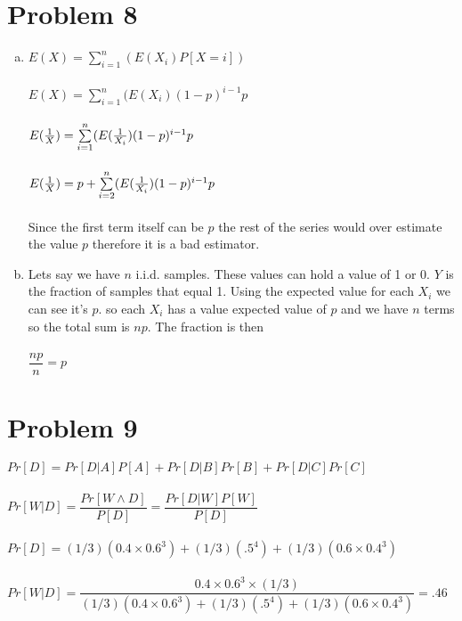 \documentclass[11pt,letterpaper]{article}
\begin{document}
\section*{Problem 8}
\begin{enumerate}[(a)]
\item
$E(X) = \sum\limits_{i=1}^{n}(E(X_i)P[X=i])$\\\\
$E(X) = \sum\limits_{i=1}^{n}(E(X_i)(1-p)^{i-1}p$\\\\
$E({1\over X}) = \sum\limits_{i=1}^{n}(E({1\over X_i})(1-p)^{i-1}p$\\\\
$E({1\over X}) = p + \sum\limits_{i=2}^{n}(E({1\over X_i})(1-p)^{i-1}p$\\\\
Since the first term itself can be $p$ the rest of the series would over estimate the value $p$ therefore it is a bad estimator.\\
\item
Lets say we have $n$ i.i.d. samples. These values can hold a value of 1 or 0. $Y$ is the fraction of samples that equal 1. Using the expected value for each $X_i$ we can see it's $p$. so each $X_i$ has a value expected value of $p$ and we have $n$ terms so the total sum is $np$. The fraction is then \\\\$\dfrac{np}{n} = p$ 
\end{enumerate}
\clearpage

\section*{Problem 9}
$Pr[D] = Pr[D|A]P[A] + Pr[D|B]Pr[B] + Pr[D|C]Pr[C]$\\\\
$Pr[W|D] = \dfrac{Pr[W\wedge D]}{P[D]} = \dfrac{Pr[D|W]P[W]}{P[D]}$\\\\
$Pr[D] = (1/3)(0.4\times0.6^3) + (1/3)(.5^4) + (1/3)(0.6\times0.4^3)$\\\\
$Pr[W|D] = \dfrac{0.4\times0.6^3\times(1/3)}{(1/3)(0.4\times0.6^3) + (1/3)(.5^4) + (1/3)(0.6\times0.4^3)} = .46$\\\\
\end{document}
